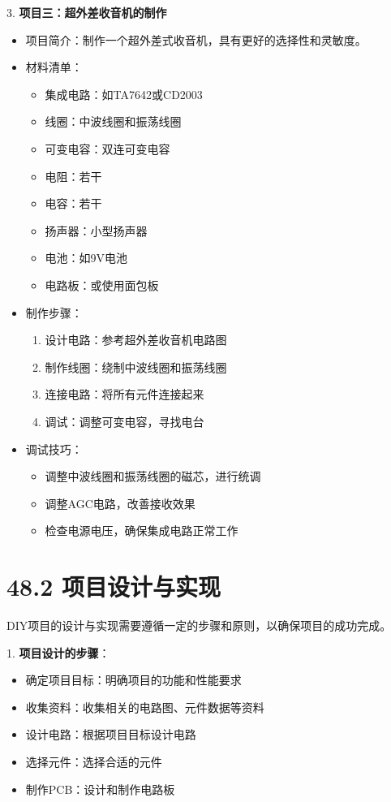 \documentclass[12pt,UTF8]{ctexbook}
\begin{document}
3. \textbf{项目三：超外差收音机的制作}
   \begin{itemize}[leftmargin=3.5em]
   \item 项目简介：制作一个超外差式收音机，具有更好的选择性和灵敏度。
   \item 材料清单：
     \begin{itemize}[leftmargin=3.5em]
     \item 集成电路：如TA7642或CD2003
     \item 线圈：中波线圈和振荡线圈
     \item 可变电容：双连可变电容
     \item 电阻：若干
     \item 电容：若干
     \item 扬声器：小型扬声器
     \item 电池：如9V电池
     \item 电路板：或使用面包板
     \end{itemize}
   \item 制作步骤：
     \begin{enumerate}
     \item 设计电路：参考超外差收音机电路图
     \item 制作线圈：绕制中波线圈和振荡线圈
     \item 连接电路：将所有元件连接起来
     \item 调试：调整可变电容，寻找电台
     \end{enumerate}
   \item 调试技巧：
     \begin{itemize}[leftmargin=3.5em]
     \item 调整中波线圈和振荡线圈的磁芯，进行统调
     \item 调整AGC电路，改善接收效果
     \item 检查电源电压，确保集成电路正常工作
     \end{itemize}
   \end{itemize}

\section*{48.2 项目设计与实现}

DIY项目的设计与实现需要遵循一定的步骤和原则，以确保项目的成功完成。

1. \textbf{项目设计的步骤}：
   \begin{itemize}[leftmargin=3.5em]
   \item 确定项目目标：明确项目的功能和性能要求
   \item 收集资料：收集相关的电路图、元件数据等资料
   \item 设计电路：根据项目目标设计电路
   \item 选择元件：选择合适的元件
   \item 制作PCB：设计和制作电路板
   \end{itemize}
\end{document}
